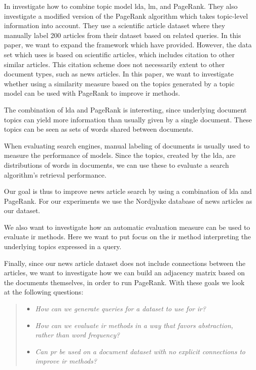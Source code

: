 In \cite{yang2009topic} \citeauthor{yang2009topic} investigate how to combine topic model \gls{lda}, \gls{lm}, and PageRank.
They also investigate a modified version of the PageRank algorithm which takes topic-level information into account.
They use a scientific article dataset where they manually label 200 articles from their dataset based on related queries. 
In this paper, we want to expand the framework which \cite{yang2009topic} have provided.
However, the data set which \cite{yang2009topic} uses is based on scientific articles, which includes citation to other similar articles.
This citation scheme does not necessarily extent to other document types, such as news articles.
In this paper, we want to investigate whether using a similarity measure based on the topics generated by a topic model can be used with PageRank to improve \gls{ir} methods.

The combination of \gls{lda} and PageRank is interesting, since underlying document topics can yield more information than usually given by a single document.
These topics can be seen as sets of words shared between documents. 

When evaluating search engines, manual labeling of documents is usually used to measure the performance of models\cite{yang2009topic}\cite{Tang2008}.
Since the topics, created by the \gls{lda}, are distributions of words in documents, we can use these to evaluate a search algorithm's retrieval performance. 

Our goal is thus to improve news article search by using a combination of \gls{lda} and PageRank.
For our experiments we use the Nordjyske database of news articles as our dataset.

We also want to investigate how an automatic evaluation measure can be used to evaluate \gls{ir} methods.
Here we want to put focus on the \gls{ir} method interpreting the underlying topics expressed in a query.

Finally, since our news article dataset does not include connections between the articles, we want to investigate how we can build an adjacency matrix based on the documents themselves, in order to run PageRank.
With these goals we look at the following questions:
\begin{quote}
	\begin{itemize}
		\item \emph{How can we generate queries for a dataset to use for \gls{ir}?}
		\item \emph{How can we evaluate \gls{ir} methods in a way that favors abstraction, rather than word frequency?}
	        \item \emph{Can \gls{pr} be used on a document dataset with no explicit connections to improve \gls{ir} methods?}
	\end{itemize}
\end{quote}




